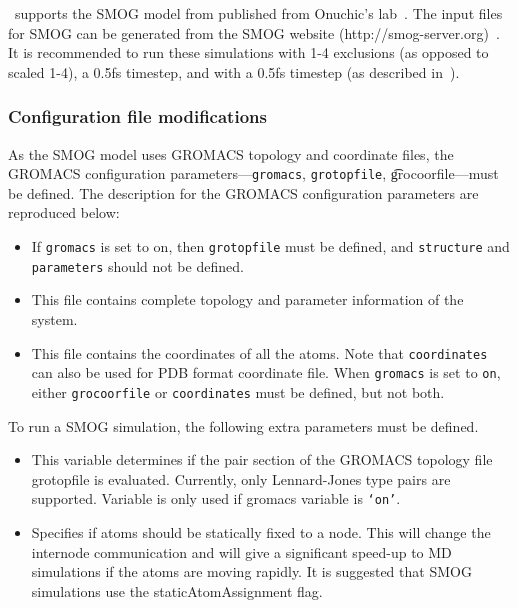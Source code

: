 \NAMD\ supports the SMOG model from published from Onuchic's lab~\cite{Whitford2009aaa,Whitford2009nhf}.
The input files for SMOG can be generated from the SMOG website (http://smog-server.org)~\cite{Noel2010ssd}.
It is recommended to run these simulations with 1-4 exclusions (as opposed to scaled 1-4), a 0.5fs timestep,
and with a 0.5fs timestep (as described in~\cite{Whitford2009aaa,Whitford2009nhf}).  

\subsubsection{Configuration file modifications} 

As the SMOG model uses GROMACS topology and coordinate files, the GROMACS
 configuration parameters---{\tt gromacs}, {\tt grotopfile}, {\t grocoorfile}---must be defined.
The description for the GROMACS configuration parameters are reproduced below:

\begin{itemize}
\item
{}
{
If {\tt gromacs} is set to on, then {\tt grotopfile} must be defined,
and {\tt structure} and {\tt parameters} should not be defined.
}
\item
{}
{
This file contains complete topology and parameter information of
the system.
}

\item
{}
{
This file contains the coordinates of all the atoms. Note that
{\tt coordinates} can also be used for PDB format coordinate
file. When {\tt gromacs} is set to {\tt on}, either {\tt grocoorfile}
or {\tt coordinates} must be defined, but not both.
}
\end{itemize}

To run a SMOG simulation, the following extra parameters must be defined.

\begin{itemize}
\item
{}
{
This variable determines if the pair section of the GROMACS topology file {grotopfile} is evaluated.
 Currently, only Lennard-Jones type pairs are supported.
Variable is only used if gromacs variable is {\tt `on'}.
}

\item
{}
{
Specifies if atoms should be statically fixed to a node.  This will change the internode communication and will give a significant
speed-up to MD simulations if the atoms are moving rapidly.  It is suggested that SMOG simulations use the staticAtomAssignment flag.
}
\end{itemize}
